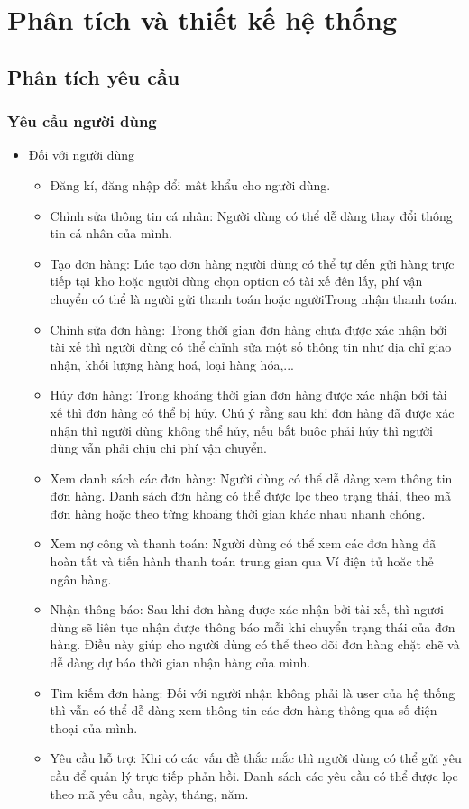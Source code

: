 \chapter{Phân tích và thiết kế hệ thống}

\section{Phân tích yêu cầu}
    \subsection{Yêu cầu người dùng}
    	\begin{itemize}
				\item Đối với người dùng
					\begin{itemize}
				        \item Đăng kí, đăng nhập đổi mât khẩu cho người dùng.
				        \item Chỉnh sửa thông tin cá nhân: Người dùng có thể dễ dàng thay đổi thông tin cá nhân của mình.
				        \item Tạo đơn hàng: Lúc tạo đơn hàng người dùng có thể tự đến gửi hàng trực tiếp tại kho hoặc người dùng chọn option có tài xế đên lấy, phí vận chuyển có thể là người gửi thanh toán hoặc ngườiTrong nhận thanh toán.
				        \item Chỉnh sửa đơn hàng: Trong thời gian đơn hàng chưa được xác nhận bởi tài xế thì người dùng có thể chỉnh sửa một số thông tin như địa chỉ giao nhận, khối lượng hàng hoá, loại hàng hóa,...
				        \item Hủy đơn hàng: Trong khoảng thời gian đơn hàng được xác nhận bởi tài xế thì đơn hàng có thể bị hủy. Chú ý rằng sau khi đơn hàng đã được xác nhận thì người dùng không thể hủy, nếu bắt buộc phải hủy thì người dùng vẫn phải chịu chi phí vận chuyển.
				        \item Xem danh sách các đơn hàng: Người dùng có thể dễ dàng xem thông tin đơn hàng. Danh sách đơn hàng có thể được lọc theo trạng thái, theo mã đơn hàng hoặc theo từng khoảng thời gian khác nhau nhanh chóng.
				        \item Xem nợ công và thanh toán: Người dùng có thể xem các đơn hàng đã hoàn tất và tiến hành thanh toán trung gian qua Ví điện tử hoăc thẻ ngân hàng.
				        \item Nhận thông báo: Sau khi đơn hàng được xác nhận bởi tài xế, thì ngươi dùng sẽ liên tục nhận được thông báo mỗi khi chuyển trạng thái của đơn hàng. Điều này giúp cho người dùng có thể theo dõi đơn hàng chặt chẽ và dễ dàng dự báo thời gian nhận hàng của mình.
				        \item Tìm kiếm đơn hàng: Đối với người nhận không phải là user của hệ thống thì vẫn có thể dễ dàng xem thông tin các đơn hàng thông qua số điện thoại của mình.
				        \item Yêu cầu hỗ trợ: Khi có các vấn đề thắc mắc thì người dùng có thể gửi yêu cầu để quản lý trực tiếp phản hồi. Danh sách các yêu cầu có thể được lọc theo mã yêu cầu, ngày, tháng, năm.
				        

\end{itemize}
\end{itemize}

